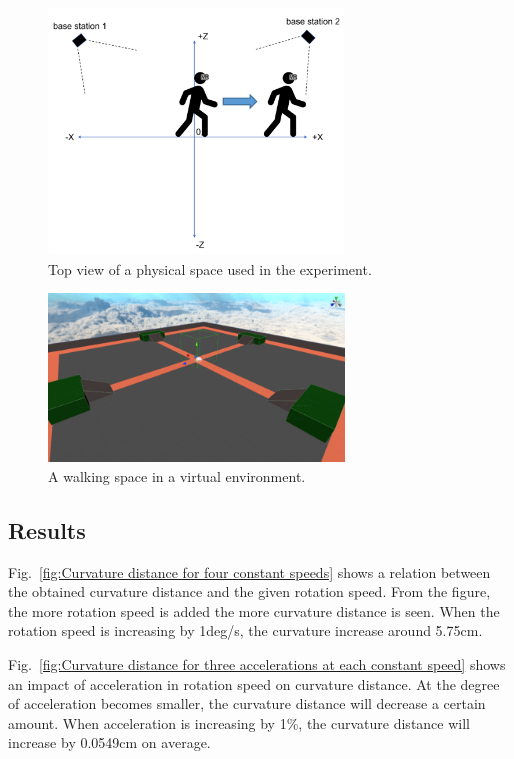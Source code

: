 \begin{figure}[H]\centering
	\includegraphics[width=0.7\textwidth]{Pictures/Base State mapping area.png}%
	\caption{Top view of a physical space used in the experiment.}\label{fig:Base State mapping area}%
\end{figure}
\begin{figure}[H]\centering
	\includegraphics[width=0.7\textwidth]{Pictures/Walking Area in VR.png}%
	\caption{A walking space in a virtual environment.}\label{fig:Walking Area in VR}%
\end{figure}

\newpage
\subsection{Results}
Fig.~\ref{fig:Curvature distance for four constant speeds} shows a relation between the obtained curvature distance and the given rotation speed. From the figure, the more rotation speed is added the more curvature distance is seen. When the rotation speed is increasing by 1deg/s, the curvature increase around 5.75cm.

Fig.~\ref{fig:Curvature distance for three accelerations at each constant speed} shows an impact of acceleration in rotation speed on curvature distance. At the degree of acceleration becomes smaller, the curvature distance will decrease a certain amount. When acceleration is increasing by 1\%, the curvature distance will increase by 0.0549cm on average.




